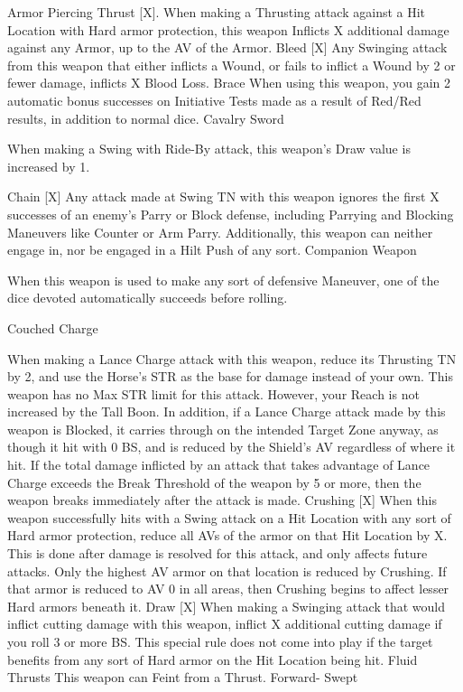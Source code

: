 \documentclass[oneside,11pt,english]{book}
\begin{document}
Armor Piercing Thrust [X]. When making a Thrusting attack against a Hit Location with Hard 
armor protection, this weapon Inflicts X additional damage against any Armor, up to the AV of the 
Armor. 
Bleed [X] Any Swinging attack from this weapon that either inflicts a Wound, or fails to inflict a Wound by 2 
or fewer damage, inflicts X Blood Loss. 
Brace When using this weapon, you gain 2 automatic bonus successes on Initiative Tests made as a result 
of Red/Red results, in addition to normal dice. 
Cavalry 
Sword 

When making a Swing with Ride-By attack, this weapon’s Draw value is increased by 1. 

Chain [X] Any attack made at Swing TN with this weapon ignores the first X successes of an enemy’s Parry 
or Block defense, including Parrying and Blocking Maneuvers like Counter or Arm Parry. 
Additionally, this weapon can neither engage in, nor be engaged in a Hilt Push of any sort. 
Companion 
Weapon 

When this weapon is used to make any sort of defensive Maneuver, one of the dice devoted 
automatically succeeds before rolling. 

Couched 
Charge 

When making a Lance Charge attack with this weapon, reduce its Thrusting TN by 2, and use the 
Horse’s STR as the base for damage instead of your own. This weapon has no Max STR limit for 
this attack. However, your Reach is not increased by the Tall Boon. In addition, if a Lance Charge 
attack made by this weapon is Blocked, it carries through on the intended Target Zone anyway, as 
though it hit with 0 BS, and is reduced by the Shield’s AV regardless of where it hit. If the total 
damage inflicted by an attack that takes advantage of Lance Charge exceeds the Break Threshold 
of the weapon by 5 or more, then the weapon breaks immediately after the attack is made. 
Crushing [X] When this weapon successfully hits with a Swing attack on a Hit Location with any sort of Hard 
armor protection, reduce all AVs of the armor on that Hit Location by X. This is done after damage 
is resolved for this attack, and only affects future attacks. Only the highest AV armor on that 
location is reduced by Crushing. If that armor is reduced to AV 0 in all areas, then Crushing begins 
to affect lesser Hard armors beneath it. 
Draw [X] When making a Swinging attack that would inflict cutting damage with this weapon, inflict X 
additional cutting damage if you roll 3 or more BS. This special rule does not come into play if the 
target benefits from any sort of Hard armor on the Hit Location being hit. 
Fluid Thrusts This weapon can Feint from a Thrust. 
Forward-
Swept 
\end{document}

